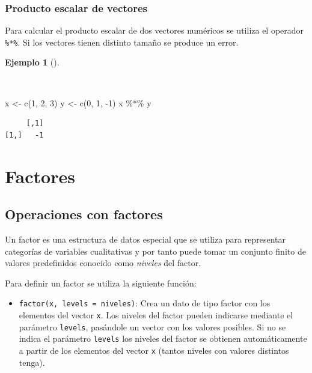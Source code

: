 \documentclass[
  a4paper,
]{scrreport}
\newenvironment{Shaded}{\begin{snugshade}}{\end{snugshade}}
\newcommand{\DecValTok}[1]{\textcolor[rgb]{0.68,0.00,0.00}{#1}}
\newcommand{\FunctionTok}[1]{\textcolor[rgb]{0.28,0.35,0.67}{#1}}
\newcommand{\NormalTok}[1]{\textcolor[rgb]{0.00,0.23,0.31}{#1}}
\newcommand{\OtherTok}[1]{\textcolor[rgb]{0.00,0.23,0.31}{#1}}
\newcommand{\SpecialCharTok}[1]{\textcolor[rgb]{0.37,0.37,0.37}{#1}}
\providecommand{\tightlist}{%
  \setlength{\itemsep}{0pt}\setlength{\parskip}{0pt}}\usepackage{longtable,booktabs,array}
\theoremstyle{definition}
\theoremstyle{definition}
\newtheorem{example}{Ejemplo}[chapter]
\theoremstyle{remark}
\begin{document}
\subsubsection{Producto escalar de
vectores}\label{producto-escalar-de-vectores}

Para calcular el producto escalar de dos vectores numéricos se utiliza
el operador \texttt{\%*\%}. Si los vectores tienen distinto tamaño se
produce un error.

\begin{example}[]\protect\hypertarget{exm-producto-escalar}{}\label{exm-producto-escalar}

~

\begin{Shaded}
\begin{Highlighting}[]
\NormalTok{x }\OtherTok{\textless{}{-}} \FunctionTok{c}\NormalTok{(}\DecValTok{1}\NormalTok{, }\DecValTok{2}\NormalTok{, }\DecValTok{3}\NormalTok{)}
\NormalTok{y }\OtherTok{\textless{}{-}} \FunctionTok{c}\NormalTok{(}\DecValTok{0}\NormalTok{, }\DecValTok{1}\NormalTok{, }\SpecialCharTok{{-}}\DecValTok{1}\NormalTok{)}
\NormalTok{x }\SpecialCharTok{\%*\%}\NormalTok{ y}
\end{Highlighting}
\end{Shaded}

\begin{verbatim}
     [,1]
[1,]   -1
\end{verbatim}

\end{example}

\section{Factores}\label{factores}

\subsection{Operaciones con factores}\label{operaciones-con-factores}

Un factor es una estructura de datos especial que se utiliza para
representar categorías de variables cualitativas y por tanto puede tomar
un conjunto finito de valores predefinidos conocido como \emph{niveles}
del factor.

Para definir un factor se utiliza la siguiente función:

\begin{itemize}
\tightlist
\item
  \texttt{factor(x,\ levels\ =\ niveles)}: Crea un dato de tipo factor
  con los elementos del vector \texttt{x}. Los niveles del factor pueden
  indicarse mediante el parámetro \texttt{levels}, pasándole un vector
  con los valores posibles. Si no se indica el parámetro \texttt{levels}
  los niveles del factor se obtienen automáticamente a partir de los
  elementos del vector \texttt{x} (tantos niveles con valores distintos
  tenga).
\end{itemize}
\end{document}
